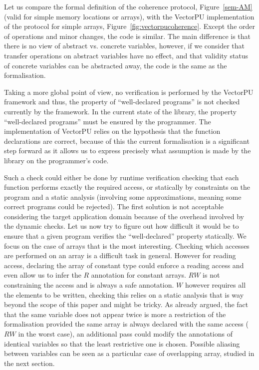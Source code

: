 \documentclass[preprint,12pt]{elsarticle}
\begin{document}
Let us compare the formal definition of the coherence protocol, Figure~\ref{sem-AM} (valid for simple memory locations or arrays), with the VectorPU implementation of the protocol for simple arrays, Figure~\ref{fig:vectorpucoherence}. Except  the order of operations and minor changes, the code is similar. The main difference is that there is no view of abstract vs. concrete variables, however, if we consider that transfer operations on abstract variables have no effect, and that validity status of concrete variables can be abstracted away, the code is  the same as the formalisation. 

Taking a more global point of view, no verification is performed by the VectorPU framework and thus, the property of ``well-declared programs'' is not checked currently by the framework. In the current state of the library, the property ``well-declared programs''  must be ensured by the programmer. The implementation of VectorPU relies on the hypothesis that the function declarations are correct, because of this the current formalisation is a significant step forward as it allows us to express precisely what assumption is made by the library on the programmer's code.

Such a check could either be done  by runtime verification checking that each function performs exactly the required access, or  statically by constraints on the program and a static analysis (involving some approximations, meaning  some correct programs could be rejected). The first solution  is not acceptable considering the target application domain because of the overhead involved by the dynamic checks. 
Let us now try to figure out how difficult it would be to ensure that a given program verifies the ``well-declared'' property statically. We focus on the case of arrays that is the most interesting. Checking which accesses are performed on an array is a difficult task in general. However for reading access, declaring the  array of constant type could enforce a reading access and even allow us to infer the $R$ annotation for constant arrays. $RW$ is not constraining the access and is always a safe annotation. $W$ however requires all the elements to be written, checking this relies on a static analysis that is way beyond the scope of this paper and might be tricky. As already argued, the fact that the same variable does not appear twice is more  a restriction of the formalisation provided the same array is always declared with the same access ($RW$ in the worst case), an additional pass could modify the annotations of identical variables so that the least restrictive one is chosen. Possible aliasing between variables can be seen as a particular case of overlapping array, studied in the next section. 
\end{document}

